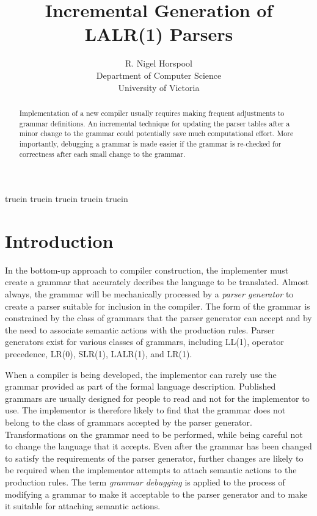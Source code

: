  truein
 truein
 truein
 truein
 truein
\title{Incremental Generation of LALR(1) Parsers}
\author{R. Nigel Horspool \\
Department of Computer Science \\ University of Victoria}

\maketitle
\begin{abstract}
Implementation of a new compiler usually requires making
frequent adjustments to grammar definitions.
An incremental technique for updating the parser tables
after a minor change to the grammar could potentially save
much computational effort.
More importantly, debugging a grammar is made easier if the
grammar is re-checked for correctness after each small change
to the grammar.
\end{abstract}
\section{Introduction}
In the bottom-up approach to compiler construction,
the implementer must create a grammar that accurately decribes
the language to be translated.
Almost always, the grammar will be mechanically processed
by a {\em parser generator} to create a parser suitable for inclusion
in the compiler.
The form of the grammar is constrained by the class of grammars
that the parser generator can accept and by the need to associate
semantic actions with the production rules.
Parser generators exist for various classes of grammars,
including  LL(1), operator precedence,
LR(0), SLR(1), LALR(1), and LR(1).

When a compiler is being developed, the implementor can rarely
use the grammar provided as part of the formal language description.
Published grammars are usually designed for people to read and not
for the implementor to use.
The implementor is therefore likely to find that the grammar does not
belong to the class of grammars accepted by the parser generator.
Transformations on the grammar need to be performed, while
being careful not to change the language that it accepts.
Even after the grammar has been changed to satisfy the
requirements of the parser generator,
further changes are likely to be required when the implementor
attempts to attach semantic actions to the production rules.
The term {\em grammar debugging} is applied to the
process of modifying a grammar to make it acceptable to
the parser generator and to make it suitable for attaching
semantic actions.

